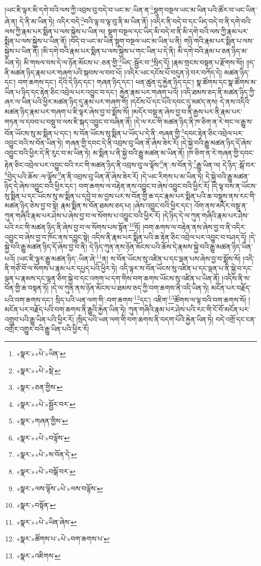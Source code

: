 །ཡང་ཇི་ལྟར་མི་དགེ་བའི་ལས་ཀྱི་འབྲས་བུ་བདེ་བ་ཡང་མ་:ཡིན་ན་\footnote{«སྣར་»«པེ་»ཡིན་}སྡུག་བསྔལ་ཡང་མ་ཡིན་པའི་ཚོར་བ་ཡང་ཡིན་ཞེ་ན། དེ་ནི་མ་ཡིན་ཏེ། འདིར་བདེ་\footnote{«སྣར་»«པེ་»སྡེ་}བའི་ལྟ་བ་ལྟ་བུ་ནི་མ་ཡིན་ནོ། །འདིར་ནི་བདེ་བ་དང་ཡིད་བདེ་བ་ནི་དགེ་བའི་ལས་ཀྱི་རྣམ་པར་སྨིན་པ་ལས་སྐྱེས་པ་ཡིན་ལ། སྡུག་བསྔལ་དང་ཡིད་མི་བདེ་བ་ནི་མི་དགེ་བའི་ལས་ཀྱི་རྣམ་པར་སྨིན་པ་ལས་སྐྱེས་པ་ཡིན་ནོ། །བདེ་བ་ཡང་མ་ཡིན་སྡུག་བསྔལ་ཡང་མ་ཡིན་པ་ནི། གཉི་གའི་རྣམ་པར་སྨིན་པ་ལས་སྐྱེས་པ་ཡིན་ནོ། །མི་དགེ་བའི་རྣམ་པར་སྨིན་པ་ལས་སྐྱེས་པ་གང་ཡིན་པ་དེ་ནི། མི་དགེ་བའི་རྣམ་པ་ཅན་ཉིད་མ་ཡིན་ཏེ། མི་གསལ་བས་དེ་ལ་ཉོན་མོངས་པ་:ཅན་གྱི་\footnote{«སྣར་»ཅན་གྱིས་}ཡིད་:སྦྱོར་བ་\footnote{«སྣར་»«པེ་»སྦྱོར་བར་}སྲིད་དོ། །རྣམ་གྲངས་བསྟན་པ་རྫོགས་སོ།། །།ད་ནི་མཚན་ཉིད་རྣམ་པར་གཞག་པའི་སྐབས་ལ་བབ་པོ། །འདིར་ཡང་དངོས་པོ་བདུན་ཉེ་བར་བཀོད་དེ། མཚན་ཉིད་དང་། བག་ཆགས་དང་། དེའི་དེ་ཉིད་དང་། གཞན་ཉིད་དང་། ཕན་ཚུན་དུ་རྐྱེན་ཉིད་དང་། སྣ་ཚོགས་དང་སྣ་ཚོགས་མ་ཡིན་པ་ཉིད་དང་རྟེན་ཅིང་འབྲེལ་པར་འབྱུང་བ་དང་། རྐྱེན་རྣམ་པར་གཞག་པའོ། །འདི་ཐམས་ཅད་ནི་མཚན་ཉིད་ཀྱི་ཞར་ལ་ཡིན་པའི་ཕྱིར་མཚན་ཉིད་དུ་རྣམ་པར་གཞག་གོ། །དངོས་པོ་དང་པོའི་དབང་དུ་མཛད་ནས། དེ་ནས་འདིའི་མཚན་ཉིད་རྣམ་པར་གཞག་པ་ཇི་ལྟར་ཞེས་བྱ་བ་སྨོས་སོ། །མདོར་བསྡུ་ན་ཞེས་བྱ་བ་ནི་རྒྱས་པར་ནི་རྣམ་པར་གཏན་ལ་དབབ་པ་བསྡུ་བ་ལས་ཇི་སྐད་འབྱུང་བ་བཞིན་ནོ། །དེ་ལ་རང་གི་མཚན་ཉིད་ནི་ཁ་ཅིག་ན་རེ་གང་ལ་རྒྱུ་ས་བོན་ཡོངས་སུ་མ་སྨིན་པ་དང་། ས་བོན་ཡོངས་སུ་སྨིན་པ་ཡོད་པ་དེ་ནི་:གཞན་གྱི་\footnote{«སྣར་»གཞན་གྱིས་}དབང་རྟེན་ཅིང་འབྲེལ་པར་འབྱུང་བའི་ས་བོན་ཡིན་ཏེ། གཞན་གྱི་དབང་དེ་ནི་འབྲས་བུ་ཡིན་ནོ་ཞེས་ཟེར་རོ། །དེ་སྐྱེ་བའི་རྒྱུ་མཚན་ཉིད་དོ་ཞེས་འབྱུང་བའི་ཕྱིར་དེ་ནི་རུང་བ་མ་ཡིན་ཏེ། མ་སྨིན་པ་ནི་སྐྱེ་བའི་རྒྱུ་མཚན་མ་ཡིན་ནོ། །ཁ་ཅིག་ན་རེ་གཞན་གྱི་དབང་རྟེན་ཅིང་འབྲེལ་པར་འབྱུང་བའི་རང་གི་མཚན་ཉིད་ནི་འབྲས་བུ་ལ་ལྟོས་\footnote{«སྣར་»«པེ་»བལྟོས་}ན་:ས་བོན་ཏེ་\footnote{«སྣར་»«པེ་»ས་བོན་དེ་}རྒྱུ་ཡིན་ལ། དེ་ཉིད་:སྒོ་བར་\footnote{«སྣར་»«པེ་»བསྒོ་བར་}བྱེད་པའི་ཆོས་:ལ་ལྟོས་\footnote{«སྣར་»ལས་ལྟོས་«པེ་»ལས་བལྟོས་}ན་ནི་འབྲས་བུ་ཡིན་ནོ་ཞེས་ཟེར་རོ། །དེ་ཡང་རིགས་པ་མ་ཡིན་ཏེ། དེ་སྐྱེ་བའི་རྒྱུ་མཚན་ཉིད་དེ་ཞེས་འབྱུང་བའི་ཕྱིར་དང་། བག་ཆགས་ལ་བརྟེན་ནས་འབྱུང་བ་ཞེས་འབྱུང་བའི་ཕྱིར་རོ། །དེ་ལྟ་བས་ན་ཡོངས་སུ་སྨིན་པ་དང་ཡོངས་སུ་མ་སྨིན་པ་དབྱེ་བ་མ་བྱས་པར་ས་བོན་གྱི་ཆ་དང་རྣམ་པར་སྨིན་པའི་ཆ་བསྡུས་ནས་རང་གི་མཚན་ཉིད་ཅེས་བྱ་བ་སྟེ། རྣམ་སྨིན་ས་བོན་ཐམས་ཅད་པ། །ཞེས་འབྱུང་བའི་ཕྱིར་དང་། འོག་ནས་མདོར་བསྡུ་ན་ཀུན་གཞིའི་རྣམ་པར་ཤེས་པ་ཞེས་བྱ་བ་ལ་སོགས་པ་འབྱུང་བའི་ཕྱིར་རོ། །དེ་ཉིད་དེ་ལ་ཀུན་གཞིའི་རྣམ་པར་ཤེས་པའི་རང་གི་མཚན་ཉིད་ནི་ཞེས་བྱ་བ་ལ་སོགས་པས་སྟོན་\footnote{«སྣར་»བསྟོན་}ཏོ། །བག་ཆགས་ལ་བརྟེན་ནས་ཞེས་བྱ་བ་ནི་འདིར་འབྱུང་བ་ཞེས་བྱ་བ་ཁོང་ནས་དབྱུང་སྟེ། འདིས་ནི་རྣམ་པར་སྨིན་པའི་ཆ་རྟེན་ཅིང་འབྲེལ་པར་འབྱུང་བ་བཤད་དོ། །དེ་སྐྱེ་བའི་རྒྱུ་མཚན་ཉིད་དོ་ཞེས་བྱ་བ་ནི། དེ་ཉིད་ཀུན་ནས་ཉོན་མོངས་པའི་ཆོས་དེ་རྣམས་སྐྱེ་བའི་རྒྱུ་མཚན་ཉིད་ཡིན་པའོ། །ཡང་ཇི་ལྟར་རྒྱུ་མཚན་ཉིད་:ཡིན་ཞེ་\footnote{«སྣར་»«པེ་»ཡིན་ཞེས་}ན། ས་བོན་ཡོངས་སུ་འཛིན་པ་དང་ལྡན་པས་ཞེས་བྱ་བ་སྨོས་སོ། །འདི་ནི་གཙོ་བོ་ལ་སོགས་པ་རྣམ་པར་དཔྱད་པའི་ཕྱིར་ཏེ། འདི་ལྟར་ས་བོན་ཡོངས་སུ་འཛིན་པ་དང་ལྡན་པ་ནི་སྐྱེ་བ་དང་ལྡན་པ་རྣམས་དང་ལྷན་ཅིག་སྐྱེ་བ་དང་འགག་པ་དག་གིས་བག་ཆགས་ཡོངས་སུ་འཛིན་པ་ཡིན་ནོ། །འདིས་ནི་ས་བོན་གྱི་ཆ་བསྟན་ཏོ། །དེ་ལ་ཀུན་ནས་ཉོན་མོངས་པ་ཐམས་ཅད་ཀྱི་བག་ཆགས་ནི་འདི་ཡིན་ཏེ། མངོན་པར་བརྗོད་པའི་བག་ཆགས་དང་། སྲིད་པའི་ཡན་ལག་གི་:བག་ཆགས་\footnote{«སྣར་»ཚོགས་པ་«པེ་»བག་ཆགས་པ་}དང་། འཇིག་\footnote{«སྣར་»འཇིགས་}ཚོགས་ལ་ལྟ་བའི་བག་ཆགས་སོ། །མངོན་པར་བརྗོད་པའི་བག་ཆགས་ནི་རྒྱུའི་རྐྱེན་ཡིན་ཏེ། ཀུན་གཞིའི་རྣམ་པར་ཤེས་པའི་རང་གི་ངོ་བོ་མངོན་པར་འགྲུབ་པའི་རྒྱུ་ཡིན་པའི་ཕྱིར་རོ། །སྲིད་པའི་ཡན་ལག་གི་བག་ཆགས་ནི་བདག་པོའི་རྐྱེན་ཡིན་ཏེ། བདེ་འགྲོ་དང་ངན་འགྲོར་འགྱུར་བའི་རྒྱུ་ཡིན་པའི་ཕྱིར་རོ། 